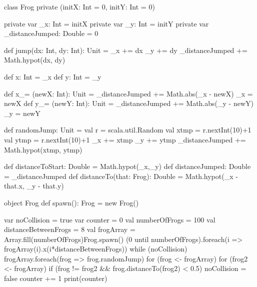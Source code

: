 \Subtask \begin{CodeSmall}
class Frog private (initX: Int = 0, initY: Int = 0) {
	private var _x: Int = initX
	private var _y: Int = initY
	private var _distanceJumped: Double = 0

	def jump(dx: Int, dy: Int): Unit = {
		_x += dx
		_y += dy
		_distanceJumped += Math.hypot(dx, dy)
	}

	def x: Int = _x
	def y: Int = _y

	def x_= (newX: Int): Unit = {
		_distanceJumped += Math.abs(_x - newX)
		_x = newX
	}
	def y_= (newY: Int): Unit = {
		_distanceJumped += Math.abs(_y - newY)
		_y = newY
	}

	def randomJump: Unit = {
		val r = scala.util.Random
		val xtmp = r.nextInt(10)+1
		val ytmp = r.nextInt(10)+1
		_x += xtmp
		_y += ytmp
		_distanceJumped += Math.hypot(xtmp, ytmp)
	}

	def distanceToStart: Double = Math.hypot(_x,_y)
	def distanceJumped: Double = _distanceJumped
	def distanceTo(that: Frog): Double = Math.hypot(_x - that.x, _y - that.y)
}

object Frog {
	def spawn(): Frog = new Frog()
}
\end{CodeSmall}

\Subtask \begin{CodeSmall}
var noCollision = true
var counter = 0
val numberOfFrogs = 100
val distanceBetweenFrogs = 8
val frogArray = Array.fill(numberOfFrogs){Frog.spawn()}
(0 until numberOfFrogs).foreach(i => frogArray(i).x(i*distanceBetweenFrogs))
while (noCollision) {
	frogArray.foreach(frog => frog.randomJump)
	for (frog <- frogArray) {
		for (frog2 <- frogArray) {
			if (frog != frog2 && frog.distanceTo(frog2) < 0.5) {
				noCollision = false
			}
		}
	}
	counter += 1
}
print(counter)
\end{CodeSmall}


\clearpage

\ExtraTasks %

\Task

\vspace{1em} %

